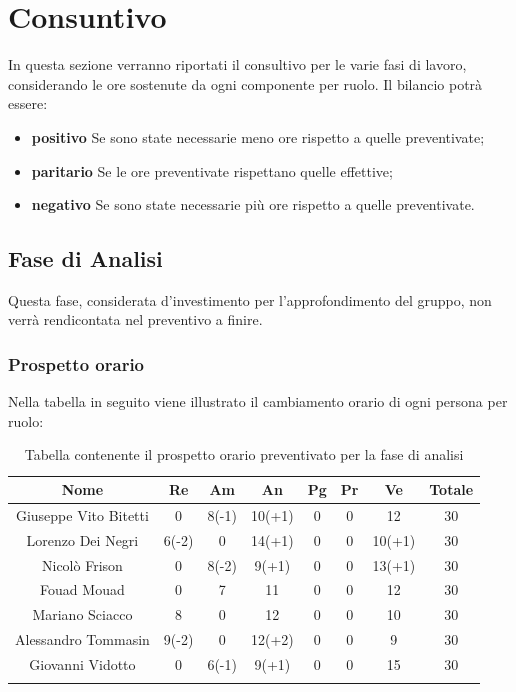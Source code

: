 \section{Consuntivo}
		In questa sezione verranno riportati il consultivo per le varie fasi di lavoro, considerando le ore sostenute da ogni componente per ruolo. Il bilancio potrà essere:
		\begin{itemize}
			\item \textbf{positivo} Se sono state necessarie meno ore rispetto a quelle preventivate;	 
			\item \textbf{paritario} Se le ore preventivate rispettano quelle effettive;	 
			\item \textbf{negativo}	Se sono state necessarie più ore rispetto a quelle preventivate.
		\end{itemize}
	\subsection{Fase di Analisi}
		Questa fase, considerata d'investimento per l'approfondimento del gruppo, non verrà rendicontata nel preventivo a finire. 
		\subsubsection{Prospetto orario}
			Nella tabella in seguito viene illustrato il cambiamento orario di ogni persona per ruolo:
			
			\begin{longtable}{|c|c|c|c|c|c|c|c}
				\hline
				\rowcolor{lighter-grayer}
				\textbf{Nome} & \textbf{Re} & \textbf{Am} & \textbf{An} & \textbf{Pg}  & \textbf{Pr}   & \textbf{Ve} & \textbf{Totale} \\
				\hline
				\endfirsthead
				
				\hline
				Giuseppe Vito Bitetti 		& 0 & 8(-1) & 10(+1) & 0 & 0 & 12 & 30\\
				\hline
				\hline
				Lorenzo Dei Negri			 & 6(-2) & 0 & 14(+1) & 0 & 0 & 10(+1) & 30\\
				\hline
				\hline
				Nicolò Frison 					& 0 & 8(-2) & 9(+1) & 0 & 0 & 13(+1) & 30\\
				\hline
				\hline
				Fouad Mouad 				& 0 & 7 & 11 & 0 & 0 & 12 & 30\\
				\hline
				\hline
				Mariano Sciacco 			& 8 & 0 & 12 & 0 & 0 & 10 & 30\\
				\hline
				\hline
				Alessandro Tommasin    & 9(-2) & 0 & 12(+2) & 0 & 0 & 9 & 30\\
				\hline
				\hline
				Giovanni Vidotto 			& 0 & 6(-1) & 9(+1) & 0 & 0 & 15 & 30\\
				\hline 
				\caption{Tabella contenente il prospetto orario preventivato per la fase di analisi}
			\end{longtable}
			\pagebreak	
			
